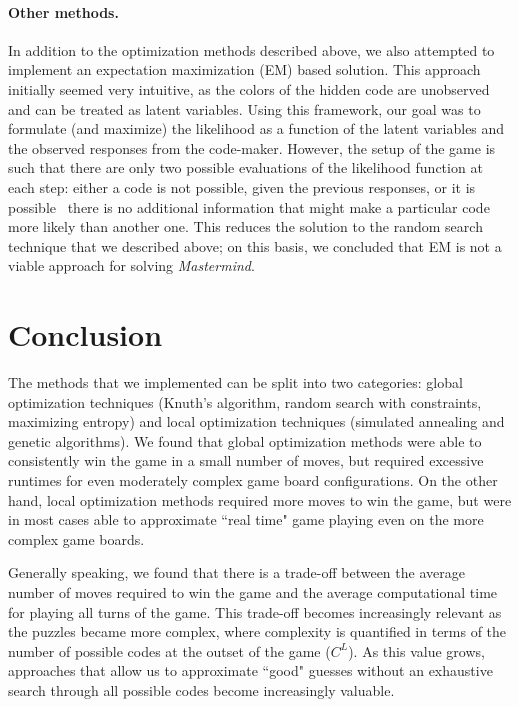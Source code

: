 \documentclass[11pt]{article}
\begin{document}
\paragraph{Other methods.} In addition to the optimization methods described above, we also attempted to implement an expectation maximization (EM) based solution. This approach initially seemed very intuitive, as the colors of the hidden code are unobserved and can be treated as latent variables. Using this framework, our goal was to formulate (and maximize) the likelihood as a function of the latent variables and the observed responses from the code-maker. However, the setup of the game is such that there are only two possible evaluations of the likelihood function at each step: either a code is not possible, given the previous responses, or it is possible \textendash \ there is no additional information that might make a particular code more likely than another one. This reduces the solution to the random search technique that we described above; on this basis, we concluded that EM is not a viable approach for solving \textit{Mastermind}.

\section{Conclusion}

The methods that we implemented can be split into two categories: global optimization techniques (Knuth's algorithm, random search with constraints, maximizing entropy) and local optimization techniques (simulated annealing and genetic algorithms).  We found that global optimization methods were able to consistently win the game in a small number of moves, but required excessive runtimes for even moderately complex game board configurations. On the other hand, local optimization methods required more moves to win the game, but were in most cases able to approximate ``real time" game playing even on the more complex game boards.


Generally speaking, we found that there is a trade-off between the average number of moves required to win the game and the average computational time for playing all turns of the game. This trade-off becomes increasingly relevant as the puzzles became more complex, where complexity is quantified in terms of the number of possible codes at the outset of the game ($C^L$). As this value grows, approaches that allow us to approximate ``good" guesses without an exhaustive search through all possible codes become increasingly valuable.
\end{document}
